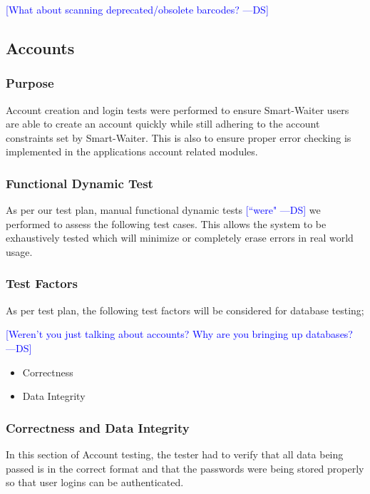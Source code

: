 \documentclass[12pt, titlepage]{article}
\newcommand{\authornote}[3]{\textcolor{#1}{[#3 ---#2]}}
\newcommand{\authornote}[3]{}
\newcommand{\ds}[1]{\authornote{blue}{DS}{#1}}
\begin{document}
\ds{What about scanning deprecated/obsolete barcodes?}

\subsection{Accounts}
\subsubsection{Purpose}
Account creation and login tests were performed to ensure Smart-Waiter users are able to create an account quickly while still adhering to the account constraints set by Smart-Waiter. This is also to ensure proper error checking is implemented in the applications account related modules.
\subsubsection{Functional Dynamic Test}
As per our test plan, manual functional dynamic tests 
\ds{``were"}
we performed to assess the following test cases. This allows the system to be exhaustively tested which will minimize or completely erase errors in real world usage.
\subsubsection{Test Factors}
As per test plan, the following test factors will be considered for database testing;

\ds{Weren't you just talking about accounts? Why are you bringing up databases?}

\begin{itemize}
 \item Correctness
 \item Data Integrity
 \end{itemize}
\subsubsection{Correctness and Data Integrity}
In this section of Account testing, the tester had to verify that all data being passed is in the correct format and that the passwords were being stored properly so that user logins can be authenticated. 
\end{document}
